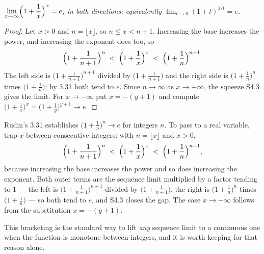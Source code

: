 \emph{$\displaystyle\lim_{x\to\infty}\Bigl(1+\frac1x\Bigr)^{x} = e$, in both
directions; equivalently $\lim_{t\to0}(1+t)^{1/t} = e$.}
\begin{proof}
Let $x>0$ and $n = \lfloor x \rfloor$, so $n \le x < n+1$. Increasing the
base increases the power, and increasing the exponent does too, so
\[ \Bigl(1+\frac{1}{n+1}\Bigr)^{n}
   \;<\; \Bigl(1+\frac1x\Bigr)^{x}
   \;<\; \Bigl(1+\frac1n\Bigr)^{n+1} . \]
The left side is $\bigl(1+\tfrac1{n+1}\bigr)^{n+1}$ divided by
$\bigl(1+\tfrac1{n+1}\bigr)$ and the right side is
$\bigl(1+\tfrac1n\bigr)^{n}$ times $\bigl(1+\tfrac1n\bigr)$; by 3.31 both
tend to $e$. Since $n \to \infty$ as $x \to +\infty$, the squeeze S4.3 gives
the limit. For $x \to -\infty$ put $x = -(y+1)$ and compute
$\bigl(1+\tfrac1x\bigr)^{x} = \bigl(1+\tfrac1y\bigr)^{y+1} \to e$.
\end{proof}

\begin{unpack}
Rudin's 3.31 establishes $\bigl(1+\tfrac1n\bigr)^n \to e$ for integers $n$.
To pass to a real variable, trap $x$ between consecutive integers: with
$n = \lfloor x \rfloor$ and $x>0$,
\[ \Bigl(1+\frac{1}{n+1}\Bigr)^{n} \;<\;
   \Bigl(1+\frac{1}{x}\Bigr)^{x} \;<\;
   \Bigl(1+\frac{1}{n}\Bigr)^{n+1}, \]
because increasing the base increases the power and so does increasing the
exponent. Both outer terms are the sequence limit multiplied by a factor
tending to $1$ --- the left is $\bigl(1+\tfrac1{n+1}\bigr)^{n+1}$ divided by
$\bigl(1+\tfrac1{n+1}\bigr)$, the right is $\bigl(1+\tfrac1n\bigr)^n$ times
$\bigl(1+\tfrac1n\bigr)$ --- so both tend to $e$, and S4.3 closes the gap.
The case $x \to -\infty$ follows from the substitution $x = -(y+1)$.

This bracketing is the standard way to lift \emph{any} sequence limit to a
continuous one when the function is monotone between integers, and it is
worth keeping for that reason alone.
\end{unpack}


